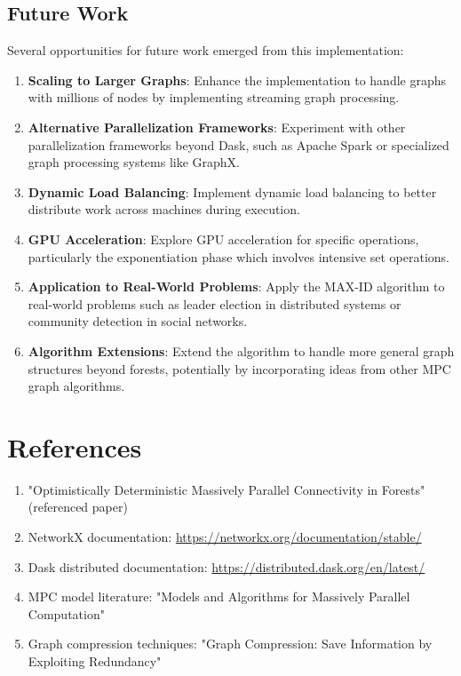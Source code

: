 \documentclass[11pt,a4paper]{article}
\begin{document}
\subsection{Future Work}

Several opportunities for future work emerged from this implementation:

\begin{enumerate}
    \item \textbf{Scaling to Larger Graphs}: Enhance the implementation to handle graphs with millions of nodes by implementing streaming graph processing.

    \item \textbf{Alternative Parallelization Frameworks}: Experiment with other parallelization frameworks beyond Dask, such as Apache Spark or specialized graph processing systems like GraphX.

    \item \textbf{Dynamic Load Balancing}: Implement dynamic load balancing to better distribute work across machines during execution.

    \item \textbf{GPU Acceleration}: Explore GPU acceleration for specific operations, particularly the exponentiation phase which involves intensive set operations.

    \item \textbf{Application to Real-World Problems}: Apply the MAX-ID algorithm to real-world problems such as leader election in distributed systems or community detection in social networks.

    \item \textbf{Algorithm Extensions}: Extend the algorithm to handle more general graph structures beyond forests, potentially by incorporating ideas from other MPC graph algorithms.
\end{enumerate}

\section{References}

\begin{enumerate}
    \item "Optimistically Deterministic Massively Parallel Connectivity in Forests" (referenced paper)
    \item NetworkX documentation: \url{https://networkx.org/documentation/stable/}
    \item Dask distributed documentation: \url{https://distributed.dask.org/en/latest/}
    \item MPC model literature: "Models and Algorithms for Massively Parallel Computation"
    \item Graph compression techniques: "Graph Compression: Save Information by Exploiting Redundancy"
\end{enumerate}
\end{document}
